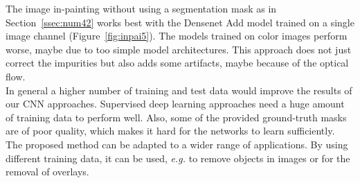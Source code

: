 The image in-painting without using a segmentation mask as in Section~\ref{ssec:num42} works best with the Densenet Add model trained on a single image channel (Figure~\ref{fig:inpai5}). The models trained on color images perform worse, maybe due to too simple model architectures. This approach does not just correct the impurities but also adds some artifacts, maybe because of the optical flow. \\ 

In general a higher number of training and test data would improve the results of our CNN approaches. Supervised deep learning approaches need a huge amount of training data to perform well. Also, some of the provided ground-truth masks are of poor quality, which makes it hard for the networks to learn sufficiently. \\

The proposed method can be adapted to a wider range of applications. By using different training data, it can be used, \textit{e.g.} to remove objects in images or for the removal of overlays.



\newpage
\label{sect:bib}






